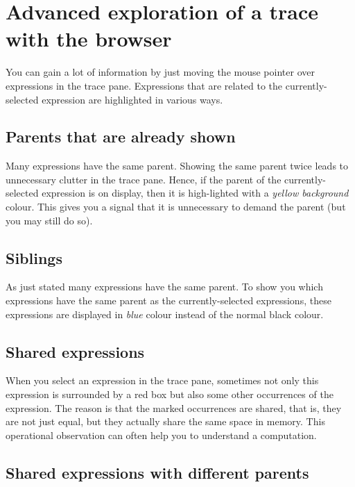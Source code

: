 \documentclass[12pt]{article}
\begin{document}

\section{Advanced exploration of a trace with the browser}\label{advanced}

You can gain a lot of information by just moving the mouse pointer over expressions in the trace pane. Expressions that are related to the currently-selected expression are highlighted in various ways.

\subsection{Parents that are already shown}

Many expressions have the same parent. Showing the same parent twice leads to unnecessary clutter in the trace pane. Hence, if the parent of the currently-selected expression is on display, then it is high-lighted with a \emph{yellow background} colour. This gives you a signal that it is unnecessary to demand the parent (but you may still do so).

\subsection{Siblings}

As just stated many expressions have the same parent. To show you which expressions have the same parent as the currently-selected expressions, these expressions are displayed in \emph{blue} colour instead of the normal black colour.

\subsection{Shared expressions}

When you select an expression in the trace pane, sometimes not only this expression is surrounded by a red box but also some other occurrences of the expression.
The reason is that the marked occurrences are shared, that is, they are not just equal, but they actually share the same space in memory.
This operational observation can often help you to understand a computation.

\subsection{Shared expressions with different parents}
\end{document}
